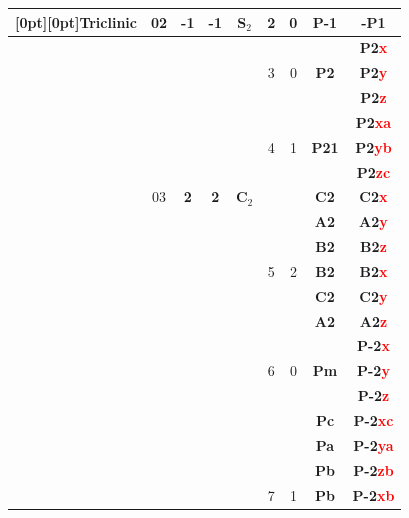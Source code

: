 \documentclass{article}      %
\begin{document}
\begin{small}
\begin{longtable}[c]{|c|c|c|c|c|c|c|c|c|}
\raisebox{2.3ex}[0pt][0pt]{\textrm{Triclinic}} & \textrm{02} &\textbf{-1} &\textbf{-1} &$\mathbf{S}_2$ &\textrm{2} &0 &\textbf{P-1}&\textbf{-P1} \\\hline
 & & & & & & & &\textbf{P2\textcolor{red}{x}}  \\\cline{9-9}
 & & & & &\textrm{3} &0 &\textbf{P2}&\textbf{P2\textcolor{red}{y}} \\\cline{9-9}
 & & & & & & & &\textbf{P2\textcolor{red}{z}}  \\\cline{6-9}
 & & & & & & & &\textbf{P2\textcolor{red}{xa}}  \\\cline{9-9}
 & & & & &\textrm{4} &1 &\textbf{P21}&\textbf{P2\textcolor{red}{yb}} \\\cline{9-9}
 & & & & & & & &\textbf{P2\textcolor{red}{zc}}  \\\cline{6-9}
 & \textrm{03} &\textbf{2} &\textbf{2} &$\mathbf{C}_2$ & & &\textbf{C2}&\textbf{C2\textcolor{red}{x}} \\\cline{8-9}
 & & & & & & &\textbf{A2} &\textbf{A2\textcolor{red}{y}}  \\\cline{8-9}
 & & & & & & &\textbf{B2} &\textbf{B2\textcolor{red}{z}}  \\\cline{8-9}
 & & & & &\textrm{5} &2&\textbf{B2} &\textbf{B2\textcolor{red}{x}}  \\\cline{8-9}
 & & & & & & &\textbf{C2} &\textbf{C2\textcolor{red}{y}}  \\\cline{8-9}
 & & & & & & &\textbf{A2} &\textbf{A2\textcolor{red}{z}}  \\\cline{2-9}
 & & & & & & & &\textbf{P-2\textcolor{red}{x}}  \\\cline{9-9}
 & & & & &\textrm{6} &0 &\textbf{Pm}&\textbf{P-2\textcolor{red}{y}} \\\cline{9-9}
 & & & & & & & &\textbf{P-2\textcolor{red}{z}}  \\\cline{6-9}
 & & & & & & &\textbf{Pc} &\textbf{P-2\textcolor{red}{xc}}  \\\cline{8-9}
 & & & & & & &\textbf{Pa} &\textbf{P-2\textcolor{red}{ya}}  \\\cline{8-9}
 & & & & & & &\textbf{Pb} &\textbf{P-2\textcolor{red}{zb}}  \\\cline{8-9}
 & & & & &\textrm{7} &1&\textbf{Pb} &\textbf{P-2\textcolor{red}{xb}}  \\\cline{8-9}

\end{longtable}
\end{small}
\end{document}
